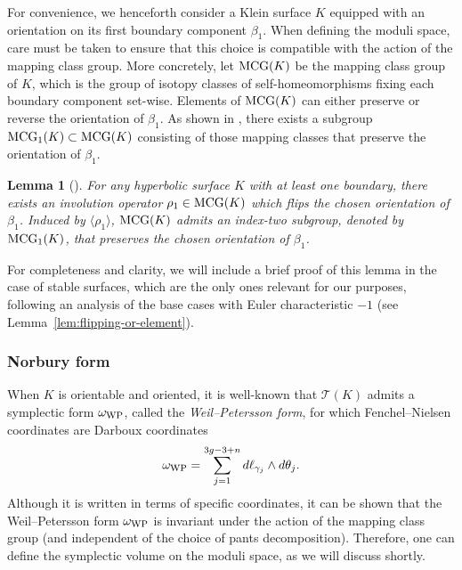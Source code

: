 \documentclass[12pt]{amsart}
\theoremstyle{plain}
\newtheorem{lemma}[theorem]{Lemma}
\theoremstyle{definition}
\theoremstyle{remark}
\numberwithin{equation}{section}
\begin{document}
For convenience, we henceforth consider a Klein surface $K$ equipped with an orientation on its first boundary component $\beta_1$. When defining the moduli space, care must be taken to ensure that this choice is compatible with the action of the mapping class group. More concretely, let ${\rm MCG}(K)$ be the mapping class group of $K$, which is the group of isotopy classes of self-homeomorphisms fixing each boundary component set-wise. Elements of ${\rm MCG}(K)$ can either preserve or reverse the orientation of $\beta_1$. As shown in \cite{Nor07}, there exists a subgroup  ${\rm MCG}_1(K)\subset {\rm MCG}(K)$ consisting of those mapping classes that preserve the orientation of $\beta_1$.

\begin{lemma}[\cite{Nor07}]\label{lem:orientation}
    For any hyperbolic surface $K$ with at least one boundary, there exists an involution operator $\rho_1\in{\rm MCG}(K)$ which flips the chosen orientation of $\beta_1$. Induced by $\langle\rho_1\rangle$, ${\rm MCG}(K)$ admits an index-two subgroup, denoted by ${\rm MCG}_1(K)$, that preserves the chosen orientation of $\beta_1$.%
\end{lemma}

For completeness and clarity, we will include a brief proof of this lemma in the case of stable surfaces, which are the only ones relevant for our purposes, following an analysis of the base cases with Euler characteristic $-1$ (see Lemma~\ref{lem:flipping-or-element}).



\subsubsection{Norbury form}
When $K$ is orientable and oriented, it is well-known that $\mathcal{T}(K)$ admits a symplectic form $\omega_{{\rm WP}}$, called the \emph{Weil--Petersson form}, for which Fenchel--Nielsen coordinates are Darboux coordinates
\begin{equation*}
    \omega_{{\rm WP}}=\sum_{j=1}^{3g-3+n} d\ell_{\gamma_j}\wedge d\theta_j.
\end{equation*}
Although it is written in terms of specific coordinates, it can be shown that the Weil--Petersson form $\omega_{{\rm WP}}$ is invariant under the action of the mapping class group (and independent of the choice of pants decomposition). Therefore, one can define the symplectic volume on the moduli space, as we will discuss shortly.
\end{document}
